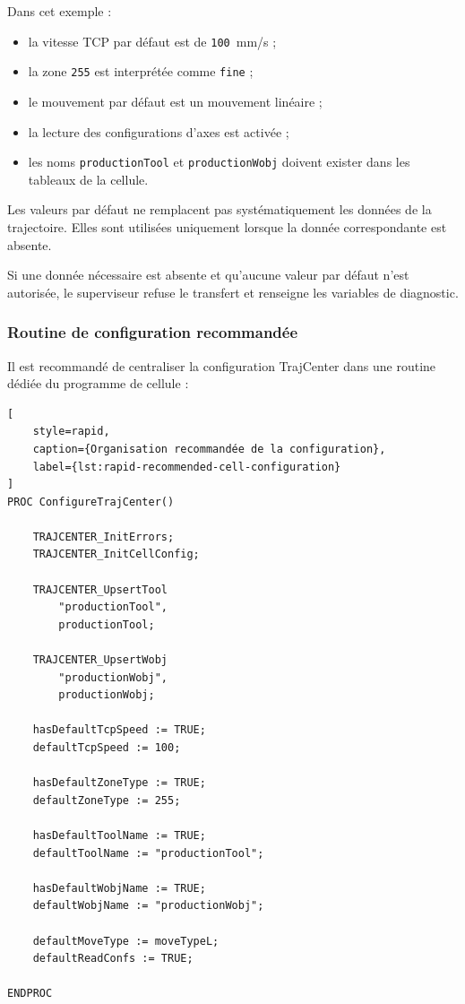 \documentclass{rapportENSAM}
\begin{document}
Dans cet exemple :

\begin{itemize}
    \item la vitesse TCP par défaut est de \texttt{100}~mm/s ;
    \item la zone \texttt{255} est interprétée comme \texttt{fine} ;
    \item le mouvement par défaut est un mouvement linéaire ;
    \item la lecture des configurations d'axes est activée ;
    \item les noms \texttt{productionTool} et
    \texttt{productionWobj} doivent exister dans les tableaux de la cellule.
\end{itemize}

Les valeurs par défaut ne remplacent pas systématiquement les données de la
trajectoire. Elles sont utilisées uniquement lorsque la donnée correspondante
est absente.

Si une donnée nécessaire est absente et qu'aucune valeur par défaut n'est
autorisée, le superviseur refuse le transfert et renseigne les variables de
diagnostic.


\subsubsection{Routine de configuration recommandée}
\label{subsubsec:rapid-config-maintenance}

Il est recommandé de centraliser la configuration TrajCenter dans une routine
dédiée du programme de cellule :

\begin{lstlisting}[
    style=rapid,
    caption={Organisation recommandée de la configuration},
    label={lst:rapid-recommended-cell-configuration}
]
PROC ConfigureTrajCenter()

    TRAJCENTER_InitErrors;
    TRAJCENTER_InitCellConfig;

    TRAJCENTER_UpsertTool
        "productionTool",
        productionTool;

    TRAJCENTER_UpsertWobj
        "productionWobj",
        productionWobj;

    hasDefaultTcpSpeed := TRUE;
    defaultTcpSpeed := 100;

    hasDefaultZoneType := TRUE;
    defaultZoneType := 255;

    hasDefaultToolName := TRUE;
    defaultToolName := "productionTool";

    hasDefaultWobjName := TRUE;
    defaultWobjName := "productionWobj";

    defaultMoveType := moveTypeL;
    defaultReadConfs := TRUE;

ENDPROC
\end{lstlisting}
\end{document}
